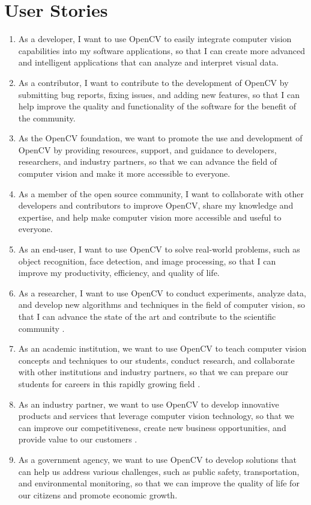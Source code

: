 \section{User Stories\label{Section::UserStories}}
\begin{enumerate}
    \item As a developer, I want to use OpenCV to easily integrate computer vision capabilities into my software applications, so that I can create more advanced and intelligent applications that can analyze and interpret visual data.
    \item As a contributor, I want to contribute to the development of OpenCV by submitting bug reports, fixing issues, and adding new features, so that I can help improve the quality and functionality of the software for the benefit of the community.
    \item As the OpenCV foundation, we want to promote the use and development of OpenCV by providing resources, support, and guidance to developers, researchers, and industry partners, so that we can advance the field of computer vision and make it more accessible to everyone.
    \item As a member of the open source community, I want to collaborate with other developers and contributors to improve OpenCV, share my knowledge and expertise, and help make computer vision more accessible and useful to everyone.
    \item As an end-user, I want to use OpenCV to solve real-world problems, such as object recognition, face detection, and image processing, so that I can improve my productivity, efficiency, and quality of life.
    \item As a researcher, I want to use OpenCV to conduct experiments, analyze data, and develop new algorithms and techniques in the field of computer vision, so that I can advance the state of the art and contribute to the scientific community \cite{888718}.
    \item As an academic institution, we want to use OpenCV to teach computer vision concepts and techniques to our students, conduct research, and collaborate with other institutions and industry partners, so that we can prepare our students for careers in this rapidly growing field \cite{9103956}.
    \item As an industry partner, we want to use OpenCV to develop innovative products and services that leverage computer vision technology, so that we can improve our competitiveness, create new business opportunities, and provide value to our customers \cite{8097324}.
    \item As a government agency, we want to use OpenCV to develop solutions that can help us address various challenges, such as public safety, transportation, and environmental monitoring, so that we can improve the quality of life for our citizens and promote economic growth.
\end{enumerate}